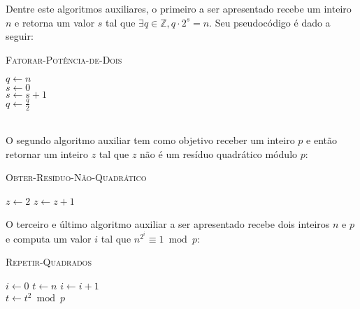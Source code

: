Dentre este algoritmos auxiliares, o primeiro a ser apresentado recebe um inteiro $n$ e retorna um valor $s$ tal que $\exists q \in \mathbb{Z}, q\cdot2^s = n$. Seu pseudocódigo é dado a seguir:
\begin{algorithm}[!htbp]
    \caption{\textsc{Fatorar-Potência-de-Dois}}
    \label{algo:2factorizationmachine}
    \SetAlgoLined
    \vspace{3mm}
    $q \leftarrow n$ \\
    $s \leftarrow 0$ \\
    {
        $s \leftarrow s + 1$
        \\
        $q \leftarrow \frac{q}{2}$
    }
\end{algorithm}
\\
O segundo algoritmo auxiliar tem como objetivo receber um inteiro $p$ e então retornar um inteiro $z$ tal que $z$ não é um resíduo quadrático módulo $p$:
\begin{algorithm}[!htbp]
    \caption{\textsc{Obter-Resíduo-Não-Quadrático}}
    \label{algo:nonquadraticresidue}
    \SetAlgoLined
    \vspace{3mm}
    $z \leftarrow 2$
    {
        $z \leftarrow z + 1$
    }
\end{algorithm}
\newpage
\noindent
O terceiro e último algoritmo auxiliar a ser apresentado recebe dois inteiros $n$ e $p$ e computa um valor $i$ tal que $n^{2^i} \equiv 1 \bmod{p}$:
\begin{algorithm}[!htbp]
    \caption{\textsc{Repetir-Quadrados}}
    \label{algo:repeatsquaring}
    \SetAlgoLined
    \vspace{3mm}
    $i \leftarrow 0$
    $t \leftarrow n$
    {
        $i \leftarrow i + 1$
        \\
        $t \leftarrow t^2 \bmod{p}$
    }
\end{algorithm}
